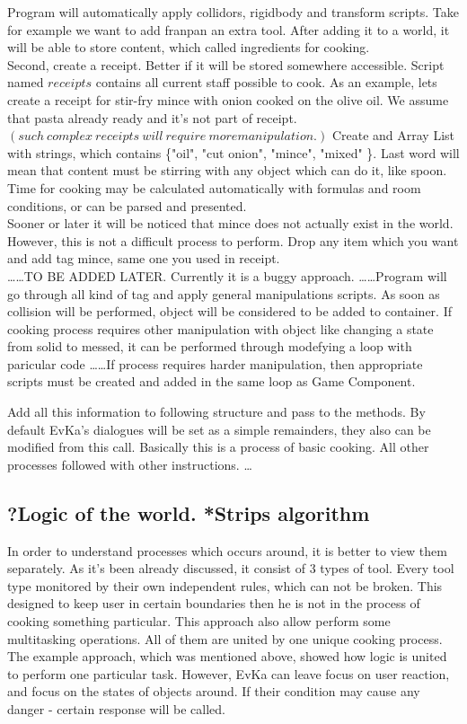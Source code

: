 \documentclass[18pt]{article}
\numberwithin{equation}{section} %
\numberwithin{figure}{section} %
\numberwithin{table}{section} %
\begin{document}
	Program will automatically apply collidors, rigidbody and transform scripts. Take for example we want to add franpan an extra tool. After adding it to a world, it will be able to store content, which called ingredients for cooking. \\
	
	Second, create a receipt. Better if it will be stored somewhere accessible. Script named $receipts$ contains all current staff possible to cook. As an example, lets create a receipt for stir-fry mince with onion cooked on the olive oil. We assume that pasta already ready and it's not part of receipt. $ \left(such\ complex\ receipts\ will\ require\ more manipulation.  \right) $ Create and Array List with strings, which contains \{"oil", "cut onion", "mince", "mixed" \}. Last word will mean that content must be stirring with any object which can do it, like spoon. Time for cooking may be calculated automatically with formulas and room conditions, or can be parsed and presented. \\
	
	Sooner or later it will be noticed that mince does not actually exist in the world. However, this is not a difficult process to perform. Drop any item which you want and add tag mince, same one you used in receipt. \\ \ldots \ldots TO BE ADDED LATER. Currently it is a buggy approach. \ldots \ldots Program will go through all kind of tag and apply general manipulations scripts. As soon as collision will be performed, object will be considered to be added to container. If cooking process requires other manipulation with object like changing a state from solid to messed, it can be performed through modefying a loop with paricular code \ldots \ldots If process requires harder manipulation, then appropriate scripts must be created and added in the same loop as Game Component. 
	
	Add all this information to following structure and pass to the methods. By default EvKa's dialogues will be set as a simple remainders, they also can be modified from this call. Basically this is a process of basic cooking. All other processes followed with other instructions. \ldots
	
	\subsection{?Logic of the world. *Strips algorithm}
	In order to understand processes which occurs around, it is better to view them separately. As it's been already discussed, it consist of 3 types of tool. Every tool type monitored by their own independent rules, which can not be broken. This designed to keep user in certain boundaries then he is not in the process of cooking something particular. This approach also allow perform some multitasking operations. All of them are united by one unique cooking process. The example approach, which was mentioned above, showed how logic is united to perform one particular task. However, EvKa can leave focus on user reaction, and focus on the states of objects around. If their condition may cause any danger - certain response will be called.
	
\end{document}
